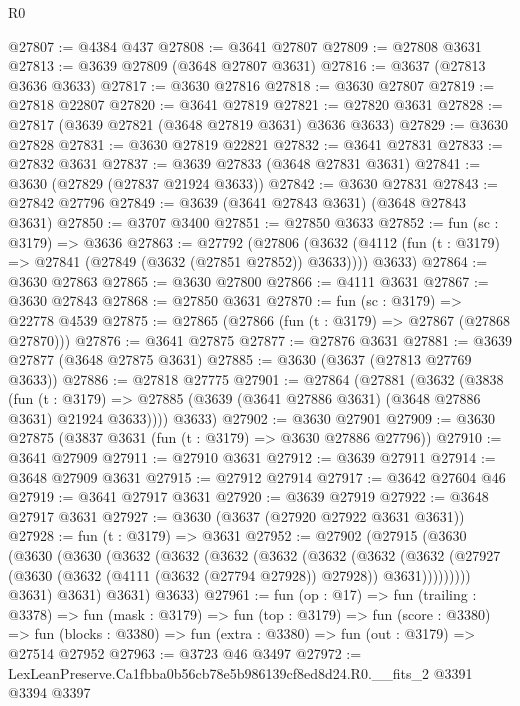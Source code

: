 \begin{lexlean}{R0}
\begin{coremodule}
@27807 := @4384 @437
@27808 := @3641 @27807
@27809 := @27808 @3631
@27813 := @3639 @27809 (@3648 @27807 @3631)
@27816 := @3637 (@27813 @3636 @3633)
@27817 := @3630 @27816
@27818 := @3630 @27807
@27819 := @27818 @22807
@27820 := @3641 @27819
@27821 := @27820 @3631
@27828 := @27817 (@3639 @27821 (@3648 @27819 @3631) @3636 @3633)
@27829 := @3630 @27828
@27831 := @3630 @27819 @22821
@27832 := @3641 @27831
@27833 := @27832 @3631
@27837 := @3639 @27833 (@3648 @27831 @3631)
@27841 := @3630 (@27829 (@27837 @21924 @3633))
@27842 := @3630 @27831
@27843 := @27842 @27796
@27849 := @3639 (@3641 @27843 @3631) (@3648 @27843 @3631)
@27850 := @3707 @3400
@27851 := @27850 @3633
@27852 := fun (sc : @3179) => @3636
@27863 := @27792
    (@27806
      (@3632 (@4112 (fun (t : @3179) => @27841 (@27849 (@3632 (@27851 @27852)) @3633))))
      @3633)
@27864 := @3630 @27863
@27865 := @3630 @27800
@27866 := @4111 @3631
@27867 := @3630 @27843
@27868 := @27850 @3631
@27870 := fun (sc : @3179) => @22778 @4539
@27875 := @27865 (@27866 (fun (t : @3179) => @27867 (@27868 @27870)))
@27876 := @3641 @27875
@27877 := @27876 @3631
@27881 := @3639 @27877 (@3648 @27875 @3631)
@27885 := @3630 (@3637 (@27813 @27769 @3633))
@27886 := @27818 @27775
@27901 := @27864
    (@27881
      (@3632
        (@3838
          (fun (t : @3179) =>
          @27885 (@3639 (@3641 @27886 @3631) (@3648 @27886 @3631) @21924 @3633))))
      @3633)
@27902 := @3630 @27901
@27909 := @3630 @27875 (@3837 @3631 (fun (t : @3179) => @3630 @27886 @27796))
@27910 := @3641 @27909
@27911 := @27910 @3631
@27912 := @3639 @27911
@27914 := @3648 @27909 @3631
@27915 := @27912 @27914
@27917 := @3642 @27604 @46
@27919 := @3641 @27917 @3631
@27920 := @3639 @27919
@27922 := @3648 @27917 @3631
@27927 := @3630 (@3637 (@27920 @27922 @3631 @3631))
@27928 := fun (t : @3179) => @3631
@27952 := @27902
    (@27915
      (@3630
        (@3630
          (@3630
            (@3632
              (@3632
                (@3632
                  (@3632
                    (@3632
                      (@3632
                        (@3632
                          (@27927
                            (@3630 (@3632 (@4111 (@3632 (@27794 @27928)) @27928)) @3631)))))))))
            @3631)
          @3631)
        @3631)
      @3633)
@27961 := fun (op : @17) =>
  fun (trailing : @3378) =>
  fun (mask : @3179) =>
  fun (top : @3179) =>
  fun (score : @3380) =>
  fun (blocks : @3380) => fun (extra : @3380) => fun (out : @3179) => @27514 @27952
@27963 := @3723 @46 @3497
@27972 := LexLeanPreserve.Ca1fbba0b56cb78e5b986139cf8ed8d24.R0.__fits_2
    @3391
    @3394
    @3397

\end{coremodule}
\end{lexlean}

